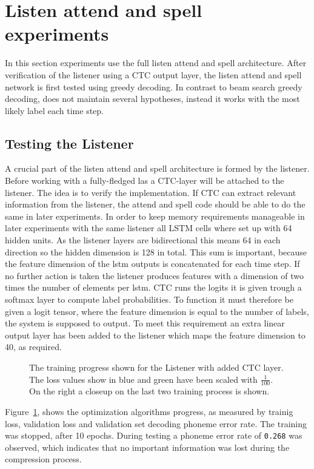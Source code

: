 \section{Listen attend and spell experiments}
In this section experiments use the full listen attend and spell architecture. After verification of the listener using a CTC output layer, the listen attend and spell network is first tested using greedy decoding. In contrast to beam search greedy decoding, does not maintain several hypotheses, instead it works with the most likely label each time step.

\subsection{Testing the Listener}
A crucial part of the listen attend and spell architecture is formed by the listener. Before working with a fully-fledged las a CTC-layer will be attached to the listener.
The idea is to verify the implementation. If CTC can extract relevant information from the listener, the attend and spell code should be able to do the same in later experiments. In order to keep memory requirements manageable in later experiments with the same listener all LSTM cells where set up with 64 hidden units. As the listener layers are bidirectional this means 64 in each direction so the hidden dimension is 128 in total. This sum is important, because the feature dimension of the lstm outputs is concatenated for each time step. If no further action is taken the listener produces features with a dimension of two times the number of elements per lstm.
CTC runs the logits it is given trough a softmax layer to compute label probabilities. To function it must therefore be given a logit tensor, where the feature dimension is equal to the number of labels, the system is supposed to output. To meet this requirement an extra linear output layer has been added to the listener which maps the feature dimension to 40, as required.
\begin{figure}


\caption{The training progress shown for the Listener with added CTC layer. The loss values show in blue and green have been scaled with $\frac{1}{100}$. On the right a closeup on the last two training process is shown.}
\label{fig:listenCTC}
\end{figure}
Figure~\ref{fig:listenCTC}, shows the optimization algorithms progress, as measured by trainig loss, validation loss and validation set decoding phoneme error rate. The training was stopped, after 10 epochs. During testing a phoneme error rate of \texttt{0.268} was observed, which indicates that no important information was lost during the compression process.




